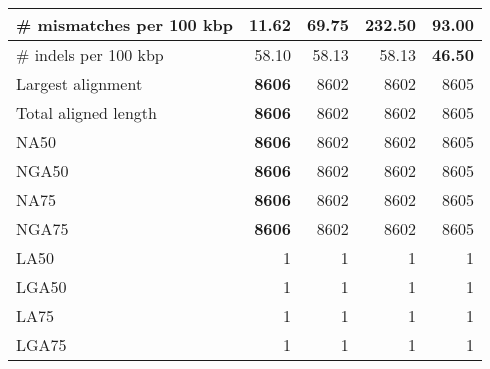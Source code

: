 \documentclass[12pt,a4paper]{article}
\begin{document}
\begin{table}[ht]
\begin{center}
\begin{tabular}{|l*{4}{|r}|}
\# mismatches per 100 kbp & {\bf 11.62} & 69.75 & 232.50 & 93.00 \\ \hline
\# indels per 100 kbp & 58.10 & 58.13 & 58.13 & {\bf 46.50} \\ \hline
Largest alignment & {\bf 8606} & 8602 & 8602 & 8605 \\ \hline
Total aligned length & {\bf 8606} & 8602 & 8602 & 8605 \\ \hline
NA50 & {\bf 8606} & 8602 & 8602 & 8605 \\ \hline
NGA50 & {\bf 8606} & 8602 & 8602 & 8605 \\ \hline
NA75 & {\bf 8606} & 8602 & 8602 & 8605 \\ \hline
NGA75 & {\bf 8606} & 8602 & 8602 & 8605 \\ \hline
LA50 & 1 & 1 & 1 & 1 \\ \hline
LGA50 & 1 & 1 & 1 & 1 \\ \hline
LA75 & 1 & 1 & 1 & 1 \\ \hline
LGA75 & 1 & 1 & 1 & 1 \\ \hline
\end{tabular}
\end{center}
\end{table}
\end{document}
